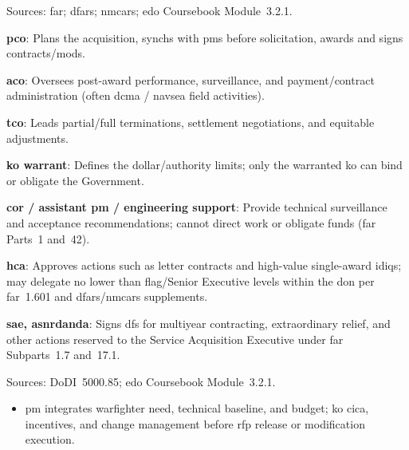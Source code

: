 \documentclass[../main.tex]{subfiles}
\begin{document}
\begin{description}[style=nextline, labelsep=0.5em, font=\bfseries]
  \item[\textbf{Contracting authority (KO family).}]
        Sources: \ac{far}; \ac{dfars}; \ac{nmcars}; \ac{edo} Coursebook Module~3.2.1.
        \begin{description}
          \item \textbf{\ac{pco}}: Plans the acquisition, synchs with \acp{pm} before solicitation, awards and signs contracts/mods.
          \item \textbf{\ac{aco}}: Oversees post-award performance, surveillance, and payment/contract administration (often \ac{dcma} / \ac{navsea} field activities).
          \item \textbf{\ac{tco}}: Leads partial/full terminations, settlement negotiations, and equitable adjustments.
          \item \textbf{\ac{ko} warrant}: Defines the dollar/authority limits; only the warranted \ac{ko} can bind or obligate the Government.
          \item \textbf{\ac{cor} / assistant \ac{pm} / engineering support}: Provide technical surveillance and acceptance recommendations; cannot direct work or obligate funds (\ac{far} Parts~1 and~42).
          \item \textbf{\ac{hca}}: Approves actions such as letter contracts and high-value single-award \acp{idiq}; may delegate no lower than flag/Senior Executive levels within the \ac{don} per \ac{far}~1.601 and \ac{dfars}/\ac{nmcars} supplements.
          \item \textbf{\ac{sae}, \ac{asnrdanda}}: Signs \acp{df} for multiyear contracting, extraordinary relief, and other actions reserved to the Service Acquisition Executive under \ac{far} Subparts~1.7 and~17.1.
        \end{description}

  \item[\textbf{Program Manager / KO partnership.}]
        Sources: DoDI~5000.85; \ac{edo} Coursebook Module~3.2.1.
        \begin{itemize}
          \item \ac{pm} integrates warfighter need, technical baseline, and budget; \ac{ko} \ac{cica}, incentives, and change management before \ac{rfp} release or modification execution.
        \end{itemize}


\end{description}
\end{document}

